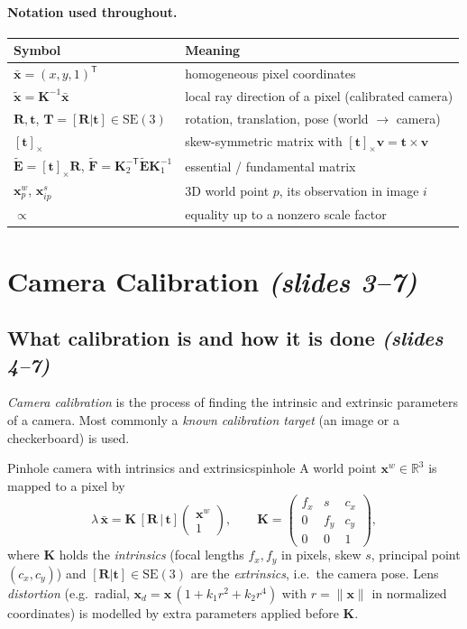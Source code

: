 \documentclass[11pt,a4paper]{article}
\newcommand{\slr}[1]{\texorpdfstring{\emph{(slides #1)}}{(slides #1)}}
\newcommand{\R}{\mathbb{R}}
\newcommand{\SE}{\mathrm{SE}(3)}
\newcommand{\xb}{\bar{\bm{x}}}      %
\newcommand{\xt}{\tilde{\bm{x}}}    %
\newcommand{\E}{\tilde{\bm E}}
\newcommand{\Fm}{\tilde{\bm F}}
\newcommand{\sk}[1]{[#1]_{\times}}
\newcommand{\norm}[1]{\lVert #1\rVert}
\newcommand{\tr}{^{\mathsf T}}
\begin{document}
\paragraph{Notation used throughout.}
\begin{center}
\begin{tabular}{@{}ll@{}}
\toprule
Symbol & Meaning\\
\midrule
$\xb=(x,y,1)\tr$ & homogeneous pixel coordinates\\
$\xt=\bm K^{-1}\xb$ & local ray direction of a pixel (calibrated camera)\\
$\bm R,\bm t$, $\bm T=[\bm R|\bm t]\in\SE$ & rotation, translation, pose (world $\to$ camera)\\
$\sk{\bm t}$ & skew-symmetric matrix with $\sk{\bm t}\bm v=\bm t\times\bm v$\\
$\E=\sk{\bm t}\bm R$, $\Fm=\bm K_2^{-\mathsf T}\E\bm K_1^{-1}$ & essential / fundamental matrix\\
$\bm x^w_p$, $\bm x^s_{ip}$ & 3D world point $p$, its observation in image $i$\\
$\propto$ & equality up to a nonzero scale factor\\
\bottomrule
\end{tabular}
\end{center}

\section{Camera Calibration \slr{3--7}}

\subsection{What calibration is and how it is done \slr{4--7}}
\emph{Camera calibration} is the process of finding the intrinsic and extrinsic parameters of a
camera. Most commonly a \emph{known calibration target} (an image or a checkerboard) is used.

\begin{definition}{Pinhole camera with intrinsics and extrinsics}{pinhole}
A world point $\bm x^w\in\R^3$ is mapped to a pixel by
\[
\lambda\,\xb=\bm K\,[\bm R\,|\,\bm t]\begin{pmatrix}\bm x^w\\1\end{pmatrix},\qquad
\bm K=\begin{pmatrix}f_x&s&c_x\\0&f_y&c_y\\0&0&1\end{pmatrix},
\]
where $\bm K$ holds the \emph{intrinsics} (focal lengths $f_x,f_y$ in pixels, skew $s$, principal
point $(c_x,c_y)$) and $[\bm R|\bm t]\in\SE$ are the \emph{extrinsics}, i.e.\ the camera pose.
Lens \emph{distortion} (e.g.\ radial, $\bm x_d=\bm x\,(1+k_1r^2+k_2r^4)$ with $r=\norm{\bm x}$ in
normalized coordinates) is modelled by extra parameters applied before $\bm K$.
\end{definition}
\end{document}
